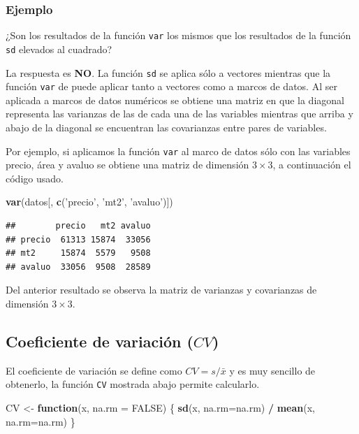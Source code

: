 \documentclass[10pt,]{krantz}
\makeatletter
\newenvironment{Shaded}{\begin{snugshade}}{\end{snugshade}}
\newcommand{\KeywordTok}[1]{\textcolor[rgb]{0.13,0.29,0.53}{\textbf{#1}}}
\newcommand{\DataTypeTok}[1]{\textcolor[rgb]{0.13,0.29,0.53}{#1}}
\newcommand{\StringTok}[1]{\textcolor[rgb]{0.31,0.60,0.02}{#1}}
\newcommand{\OtherTok}[1]{\textcolor[rgb]{0.56,0.35,0.01}{#1}}
\newcommand{\ControlFlowTok}[1]{\textcolor[rgb]{0.13,0.29,0.53}{\textbf{#1}}}
\newcommand{\OperatorTok}[1]{\textcolor[rgb]{0.81,0.36,0.00}{\textbf{#1}}}
\newcommand{\NormalTok}[1]{#1}
\newenvironment{kframe}{%
\medskip{}
\setlength{\fboxsep}{.8em}
 \def\at@end@of@kframe{}%
 \ifinner\ifhmode%
  \def\at@end@of@kframe{\end{minipage}}%
  \begin{minipage}{\columnwidth}%
 \fi\fi%
 \def\FrameCommand##1{\hskip\@totalleftmargin \hskip-\fboxsep
 \colorbox{shadecolor}{##1}\hskip-\fboxsep
     \hskip-\linewidth \hskip-\@totalleftmargin \hskip\columnwidth}%
 \MakeFramed {\advance\hsize-\width
   \@totalleftmargin\z@ \linewidth\hsize
   \@setminipage}}%
 {\par\unskip\endMakeFramed%
 \at@end@of@kframe}
\renewenvironment{Shaded}{\begin{kframe}}{\end{kframe}}
\makeatother
\begin{document}
\subsubsection*{Ejemplo}\label{ejemplo-25}

¿Son los resultados de la función \texttt{var} los mismos que los
resultados de la función \texttt{sd} elevados al cuadrado?

La respuesta es \textbf{NO}. La función \texttt{sd} se aplica sólo a
vectores mientras que la función \texttt{var} de puede aplicar tanto a
vectores como a marcos de datos. Al ser aplicada a marcos de datos
numéricos se obtiene una matriz en que la diagonal representa las
varianzas de las de cada una de las variables mientras que arriba y
abajo de la diagonal se encuentran las covarianzas entre pares de
variables.

Por ejemplo, si aplicamos la función \texttt{var} al marco de datos sólo
con las variables precio, área y avaluo se obtiene una matriz de
dimensión \(3 \times 3\), a continuación el código usado.

\begin{Shaded}
\begin{Highlighting}[]
\KeywordTok{var}\NormalTok{(datos[, }\KeywordTok{c}\NormalTok{(}\StringTok{'precio'}\NormalTok{, }\StringTok{'mt2'}\NormalTok{, }\StringTok{'avaluo'}\NormalTok{)])}
\end{Highlighting}
\end{Shaded}

\begin{verbatim}
##        precio   mt2 avaluo
## precio  61313 15874  33056
## mt2     15874  5579   9508
## avaluo  33056  9508  28589
\end{verbatim}

Del anterior resultado se observa la matriz de varianzas y covarianzas
de dimensión \(3 \times 3\).

\subsection{\texorpdfstring{Coeficiente de variación (\(CV\))
}{Coeficiente de variación (CV) }}\label{coeficiente-de-variacion-cv}

El coeficiente de variación se define como \(CV=s/\bar{x}\) y es muy
sencillo de obtenerlo, la función \texttt{CV} mostrada abajo permite
calcularlo.

\begin{Shaded}
\begin{Highlighting}[]
\NormalTok{CV <-}\StringTok{ }\ControlFlowTok{function}\NormalTok{(x, }\DataTypeTok{na.rm =} \OtherTok{FALSE}\NormalTok{) \{}
  \KeywordTok{sd}\NormalTok{(x, }\DataTypeTok{na.rm=}\NormalTok{na.rm) }\OperatorTok{/}\StringTok{ }\KeywordTok{mean}\NormalTok{(x, }\DataTypeTok{na.rm=}\NormalTok{na.rm)}
\NormalTok{\}}
\end{Highlighting}
\end{Shaded}
\end{document}
